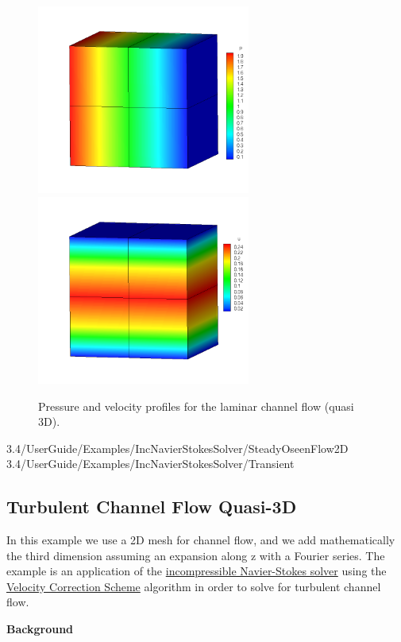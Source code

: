 
\begin{figure}
\begin{center}
\includegraphics[width=7cm]{Figures/CF3DCVP3PR.png}
\includegraphics[width=7cm]{Figures/CF3DCVP3.png}
\caption{Pressure and velocity profiles for the laminar channel flow (quasi 3D).}
\end{center}
\end{figure}

\newpage


3.4/UserGuide/Examples/IncNavierStokesSolver/SteadyOseenFlow2D
3.4/UserGuide/Examples/IncNavierStokesSolver/Transient


\subsection{Turbulent Channel Flow Quasi-3D}
In this example we use a 2D mesh for channel flow, and we add mathematically the third dimension assuming an expansion along z with a Fourier series. The example is an application of the \hyperref[IncNSsolver]{incompressible Navier-Stokes solver} using the \hyperref[VCSscheme]{Velocity Correction Scheme} algorithm in order to solve for turbulent channel flow.

\textbf{Background}

